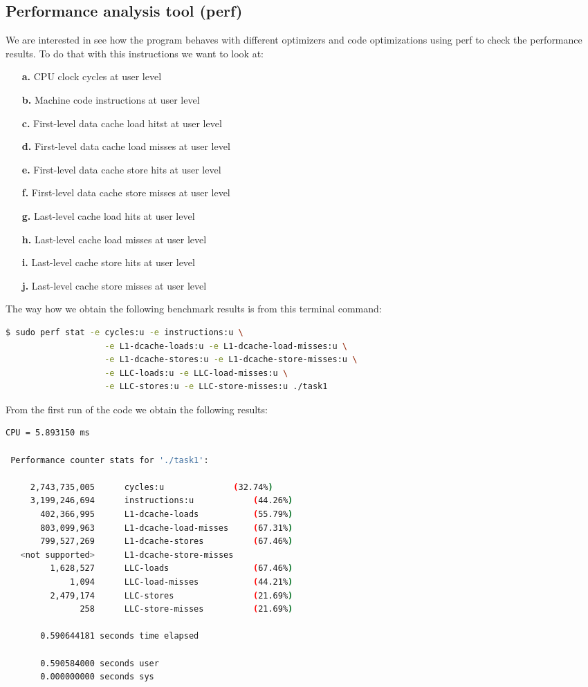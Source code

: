 \documentclass[11pt,a4paper]{article}
\begin{document}
\subsection{Performance analysis tool (perf)}
We are interested in see how the program behaves with different optimizers and code optimizations using perf to check the performance results. To do that with this instructions we want to look at:
\begin{itemize}
\item[\textbf{a.}] CPU clock cycles at user level
\item[\textbf{b.}] Machine code instructions at user level
\item[\textbf{c.}] First-level data cache load hitst at user level
\item[\textbf{d.}] First-level data cache load misses at user level
\item[\textbf{e.}] First-level data cache store hits at user level
\item[\textbf{f.}] First-level data cache store misses at user level
\item[\textbf{g.}] Last-level cache load hits at user level
\item[\textbf{h.}] Last-level cache load misses at user level
\item[\textbf{i.}] Last-level cache store hits at user level
\item[\textbf{j.}] Last-level cache store misses at user level
\end{itemize}
The way how we obtain the following benchmark results is from this terminal command:
\begin{lstlisting}[language=bash]
  $ sudo perf stat -e cycles:u -e instructions:u \
                	-e L1-dcache-loads:u -e L1-dcache-load-misses:u \
                	-e L1-dcache-stores:u -e L1-dcache-store-misses:u \
                	-e LLC-loads:u -e LLC-load-misses:u \
                	-e LLC-stores:u -e LLC-store-misses:u ./task1 
\end{lstlisting}
From the first run of the code we obtain the following results:
\begin{lstlisting}[language=bash]
CPU = 5.893150 ms 

 Performance counter stats for './task1':

     2,743,735,005      cycles:u         	  (32.74%)
     3,199,246,694      instructions:u            (44.26%)
       402,366,995      L1-dcache-loads           (55.79%)
       803,099,963      L1-dcache-load-misses     (67.31%)
       799,527,269      L1-dcache-stores          (67.46%)
   <not supported>      L1-dcache-store-misses                                      
         1,628,527      LLC-loads                 (67.46%)
             1,094      LLC-load-misses           (44.21%)
         2,479,174      LLC-stores                (21.69%)
               258      LLC-store-misses          (21.69%)

       0.590644181 seconds time elapsed

       0.590584000 seconds user
       0.000000000 seconds sys
\end{lstlisting}
\end{document}
